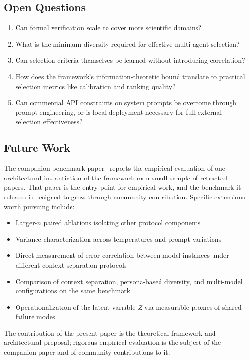 \documentclass[11pt]{article}
\begin{document}
\subsection{Open Questions}

\begin{enumerate}
    \item Can formal verification scale to cover more scientific domains?
    \item What is the minimum diversity required for effective multi-agent selection?
    \item Can selection criteria themselves be learned without introducing correlation?
    \item How does the framework's information-theoretic bound translate to practical selection metrics like calibration and ranking quality?
    \item Can commercial API constraints on system prompts be overcome through prompt engineering, or is local deployment necessary for full external selection effectiveness?
\end{enumerate}

\subsection{Future Work}

The companion benchmark paper~\citep{brilliant2026benchmark} reports the empirical evaluation of one architectural instantiation of the framework on a small sample of retracted papers. That paper is the entry point for empirical work, and the benchmark it releases is designed to grow through community contribution. Specific extensions worth pursuing include:
\begin{itemize}
    \item Larger-$n$ paired ablations isolating other protocol components
    \item Variance characterization across temperatures and prompt variations
    \item Direct measurement of error correlation between model instances under different context-separation protocols
    \item Comparison of context separation, persona-based diversity, and multi-model configurations on the same benchmark
    \item Operationalization of the latent variable $Z$ via measurable proxies of shared failure modes
\end{itemize}

The contribution of the present paper is the theoretical framework and architectural proposal; rigorous empirical evaluation is the subject of the companion paper and of community contributions to it.
\end{document}
